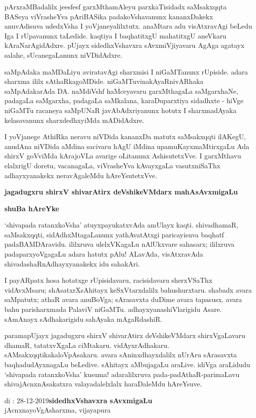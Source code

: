 \medskip

pArxraMBadalilx jeesfesf garxMthamAleyu parxkaTisidadx saMsakxqqta BASeya viVrasheYva pAriBASika padakoVshavanunx kananxDakekx anuvAdisuva udedxVsha I yoVjaneyalilxtutx. anaMtara adu visAtxravAgi beLedu Iga I rUpavanunx taLedide. kaqtiya I baqhatitxgU mahatitxgU aneVkaru kAraNarAgidAdxre. pUjayx sidedhxVshavxra sAvxmiVjiyavaru AgAga agatayx salahe, sUcanegaLanunx niVDidAdxre.

\medskip

saMpAdaka maMDaLiyu aviratavAgi sharxmisi I niGaMTanunx rUpiside. adara sharxma ililx sAthaRkagoMDide. niGaMTuvina\break kAyaRnivARhaka saMpAdakarAda DA. naMdiVshf haMceyavaru garxMthagaLa saMgarxhaNe, padagaLa saMgarxha, padagaLa saMkalana, karaDu\-parxtiya sidadhxte - hiVge niGaMTu racaneya saMpUNaR javAbAdxriyanunx hotutx I sharxmadAyaka kelasavanunx sharxdedhxyiMda mADidAdxre. 
\medskip

I yoVjanege AthiRka neravu niVDida kananxDa matutx saMsakxqqti ilAKegU, anudAna niVDida aMdina sacivaru hAgU iMdina upamuKayxmaMtirxgaLu Ada shirxV goVviMda kArajoVLa avarige oLitanunx AshisutetxVve. I garxMthavu elalxrigU doretu, vacanagaLa, viVrasheYva kAvayxgaLa vasutxniSaThx adhayxyanakekx neravAgaleMdu hAreYsutetxVve.

\vskip 1cm

\hfill {\large\bf jagadugxru shirxV shivarAtirx deVshikeVMdarx mahAsAvxmigaLu}



\begin{center}
{\Huge\bfseries shuBa hAreYke}
\end{center}

\bigskip

`shivapada ratanxkoVsha' atuyxpayukatxvAda amUlayx kaqti. shivadhamaR, saMsakxqqti, sidAdhxMtagaLanunx yathAvatAtxgi paricayisuva baqhatf padaBAMDAravidu. ililxruva ulelxVKagaLu nAlUkxvare sahasarx; ililxruva padaparxyoVgagaLu adara hatutx pAlu! ALavAda, visAtxravAda shivadashaRnAdhayxyanakekx idu sahakAri.

\medskip

I payARpatx hosa hotatxge rUpisidavaru, racisidavaru sherxVSaThx vidAvxMsaru; shAsatxrXsAhitayx keSxVtarxdalilx bahushurxtaru. shabadx avara saMpatutx; athaR avara anuBoVga; sArasavxta duDime avara tapasusx. avara bahu parisharxmada PalaviV niGaMTu. adhayxyana\-shiVlarigidu Asare. sAmAnayx sAdhakarigidu sahAyaka mAgaRdashiR.

\medskip

paramapUjayx jagadugxru shirxV shivarAtirx deVshikeVMdarx shirxVgaLavaru dhamaR, tatatxvXgaLa ciMtakaru. vidAyxrAdhakaru. sAMsakxqqtika\break kaloVpAsakaru. avara sAninxdhayxdalilx nUrAru sArasavxta baqhadudAyxnagaLu beLedive. sAhitayx aMbujagaLu araLive. idiVga araLidudu `shivapada ratanxkoVsha' kusuma! adaralilxruva pada-padAthaR-parimaLavu shivajAcnxnAsakatxra valayadalelxlalx haraDaleMdu hAreYsuve.

\vskip 1.5cm

\noindent
di : 28-12-2019\hfill {\large\bf sidedhxVshavxra sAvxmigaLu}\qquad\,\\
\phantom{a} \hfill jAcnxnayoVgAsharxma, vijayapura
